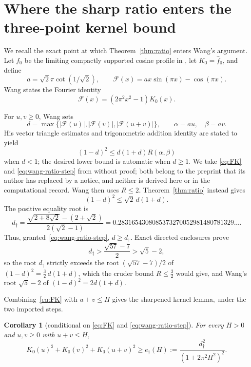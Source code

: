 \documentclass[11pt]{article}
\newtheorem{corollary}[theorem]{Corollary}
\theoremstyle{remark}
\newcommand{\cF}{\mathcal F}
\newcommand{\dsharp}{d_{\dagger}}
\newcommand{\edag}{e_{\dagger}}
\begin{document}
\section{Where the sharp ratio enters the three-point kernel bound}

We recall the exact point at which Theorem~\ref{thm:ratio} enters Wang's
argument.  Let $f_0$ be the limiting compactly supported cosine profile in
\cite{Lamzouri,WangGlobal}, let $K_0=\widehat f_0$, and define
\[
 a=\sqrt2\pi\cot(1/\sqrt2),
 \qquad \cF(x)=ax\sin(\pi x)-\cos(\pi x).
\]
Wang states the Fourier identity
\begin{equation}\label{eq:FK}
 \cF(x)=(2\pi^2x^2-1)K_0(x).
\end{equation}

For $u,v\ge0$, Wang sets
\[
 d=\max\{|\cF(u)|,|\cF(v)|,|\cF(u+v)|\},
 \qquad \alpha=au,\quad\beta=av.
\]
His vector triangle estimates and trigonometric addition identity are stated to
yield
\begin{equation}\label{eq:wang-ratio-step}
 (1-d)^2\le d(1+d)R(\alpha,\beta)
\end{equation}
when $d<1$; the desired lower bound is automatic when $d\ge1$.  We take
\eqref{eq:FK} and \eqref{eq:wang-ratio-step} from \cite{WangGlobal} without
proof; both belong to the preprint that its author has replaced by a notice,
and neither is derived here or in the computational record.
Wang then uses $R\le2$.  Theorem~\ref{thm:ratio} instead gives
\[
 (1-d)^2\le\sqrt2\,d(1+d).
\]
The positive equality root is
\begin{equation}\label{eq:ddag}
 \dsharp=
 \frac{\sqrt{2+8\sqrt2}-(2+\sqrt2)}{2(\sqrt2-1)}
 =0.2831654308085373270052981480781329\ldots .
\end{equation}
Thus, granted~\eqref{eq:wang-ratio-step}, $d\ge\dsharp$.  Exact directed enclosures
prove
\[
 \dsharp>\frac{\sqrt{57}-7}{2}>\sqrt5-2,
\]
so the root $\dsharp$ strictly exceeds the root $(\sqrt{57}-7)/2$ of
$(1-d)^2=\tfrac32\,d(1+d)$, which the cruder bound $R\le\tfrac32$ would give,
and Wang's root $\sqrt5-2$ of $(1-d)^2=2d(1+d)$.

Combining~\eqref{eq:FK} with $u+v\le H$ gives the sharpened kernel lemma, under
the two imported steps.

\begin{corollary}[conditional on \eqref{eq:FK} and \eqref{eq:wang-ratio-step}]\label{cor:kernel}
For every $H>0$ and $u,v\ge0$ with $u+v\le H$,
\begin{equation}\label{eq:energy}
 K_0(u)^2+K_0(v)^2+K_0(u+v)^2
 \ge \edag(H):=
 \frac{\dsharp^2}{(1+2\pi^2H^2)^2}.
\end{equation}
\end{corollary}
\end{document}
